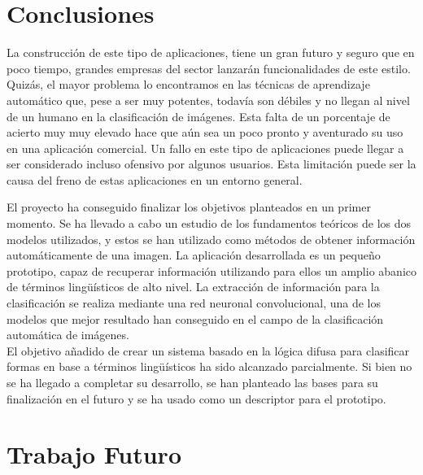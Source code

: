 \section{Conclusiones}

La construcción de este tipo de aplicaciones, tiene un gran futuro y seguro que en poco tiempo, grandes empresas del sector lanzarán funcionalidades de este estilo. Quizás, el mayor problema lo encontramos en las técnicas de aprendizaje automático que, pese a ser muy potentes, todavía son débiles y no llegan al nivel de un humano en la clasificación de imágenes. Esta falta de un porcentaje de acierto muy muy elevado hace que aún sea un poco pronto y aventurado su uso en una aplicación comercial. Un fallo en este tipo de aplicaciones puede llegar a ser considerado incluso ofensivo por algunos usuarios. Esta limitación puede ser la causa del freno de estas aplicaciones en un entorno general.

El proyecto ha conseguido finalizar los objetivos planteados en un primer momento. Se ha llevado a cabo un estudio de los fundamentos teóricos de los dos modelos utilizados, y estos se han utilizado como métodos de obtener información automáticamente de una imagen. La aplicación desarrollada es un pequeño prototipo, capaz de recuperar información utilizando para ellos un amplio abanico de términos lingüísticos de alto nivel. La extracción de información para la clasificación se realiza mediante una red neuronal convolucional, una de los modelos que mejor resultado han conseguido en el campo de la clasificación automática de imágenes.\\

El objetivo añadido de crear un sistema basado en la lógica difusa para clasificar formas en base a términos lingüísticos ha sido alcanzado parcialmente. Si bien no se ha llegado a completar su desarrollo, se han planteado las bases para su finalización en el futuro y se ha usado como un descriptor para el prototipo.\\


\section{Trabajo Futuro}

